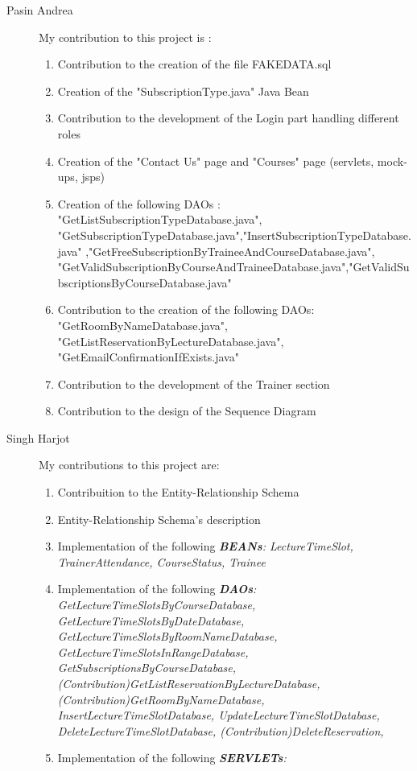 \begin{description}
	\item[Pasin Andrea] My contribution to this project is :
	\begin{enumerate}
		\item Contribution to the creation of the file FAKE\textunderscore DATA.sql 
		\item Creation of the "SubscriptionType.java" Java Bean
		\item Contribution to the development of the Login part handling different roles
		\item Creation of the "Contact Us" page and "Courses" page (servlets, mock-ups, jsps)
		\item Creation of the following DAOs : "GetListSubscriptionTypeDatabase.java", "GetSubscriptionTypeDatabase.java","InsertSubscriptionTypeDatabase.java" ,"GetFreeSubscriptionByTraineeAndCourseDatabase.java", "GetValidSubscriptionByCourseAndTraineeDatabase.java","GetValidSubscriptionsByCourseDatabase.java"
		\item Contribution to the creation of the following DAOs: "GetRoomByNameDatabase.java", "GetListReservationByLectureDatabase.java", "GetEmailConfirmationIfExists.java"
		\item Contribution to the development of the Trainer section
		\item Contribution to the design of the Sequence Diagram
	\end{enumerate}
	\item[Singh Harjot] My contributions to this project are:
	\begin{flushleft}
	\begin{enumerate}
		\item Contribuition to the Entity-Relationship Schema
		\item Entity-Relationship Schema's description
		\item Implementation of the following \textit{\textbf{BEANs}:
			LectureTimeSlot, TrainerAttendance, CourseStatus, Trainee
		}
		\item Implementation of the following \textit{\textbf{DAOs}:
			GetLectureTimeSlotsByCourseDatabase,
			GetLectureTimeSlotsByDateDatabase,
			GetLectureTimeSlotsByRoomNameDatabase,
			GetLectureTimeSlotsInRangeDatabase,
			GetSubscriptionsByCourseDatabase,
			(Contribution)GetListReservationByLectureDatabase,
			(Contribution)GetRoomByNameDatabase,
			InsertLectureTimeSlotDatabase,
			UpdateLectureTimeSlotDatabase,
			DeleteLectureTimeSlotDatabase,
			(Contribution)DeleteReservation,	
		}
		\item Implementation of the following \textit{\textbf{SERVLETs}: 
}
\end{enumerate}
\end{flushleft}
\end{description}
